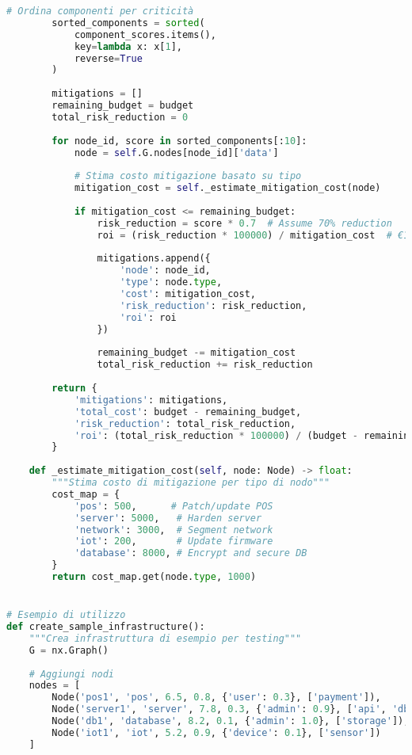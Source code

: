 \begin{lstlisting}[language=Python, caption=Implementazione dell'algoritmo ASSA-GDO]
        # Ordina componenti per criticità
        sorted_components = sorted(
            component_scores.items(), 
            key=lambda x: x[1], 
            reverse=True
        )
        
        mitigations = []
        remaining_budget = budget
        total_risk_reduction = 0
        
        for node_id, score in sorted_components[:10]:
            node = self.G.nodes[node_id]['data']
            
            # Stima costo mitigazione basato su tipo
            mitigation_cost = self._estimate_mitigation_cost(node)
            
            if mitigation_cost <= remaining_budget:
                risk_reduction = score * 0.7  # Assume 70% reduction
                roi = (risk_reduction * 100000) / mitigation_cost  # €100k per point
                
                mitigations.append({
                    'node': node_id,
                    'type': node.type,
                    'cost': mitigation_cost,
                    'risk_reduction': risk_reduction,
                    'roi': roi
                })
                
                remaining_budget -= mitigation_cost
                total_risk_reduction += risk_reduction
                
        return {
            'mitigations': mitigations,
            'total_cost': budget - remaining_budget,
            'risk_reduction': total_risk_reduction,
            'roi': (total_risk_reduction * 100000) / (budget - remaining_budget)
        }
    
    def _estimate_mitigation_cost(self, node: Node) -> float:
        """Stima costo di mitigazione per tipo di nodo"""
        cost_map = {
            'pos': 500,      # Patch/update POS
            'server': 5000,   # Harden server
            'network': 3000,  # Segment network
            'iot': 200,       # Update firmware
            'database': 8000, # Encrypt and secure DB
        }
        return cost_map.get(node.type, 1000)


# Esempio di utilizzo
def create_sample_infrastructure():
    """Crea infrastruttura di esempio per testing"""
    G = nx.Graph()
    
    # Aggiungi nodi
    nodes = [
        Node('pos1', 'pos', 6.5, 0.8, {'user': 0.3}, ['payment']),
        Node('server1', 'server', 7.8, 0.3, {'admin': 0.9}, ['api', 'db']),
        Node('db1', 'database', 8.2, 0.1, {'admin': 1.0}, ['storage']),
        Node('iot1', 'iot', 5.2, 0.9, {'device': 0.1}, ['sensor'])
    ]
    

\end{lstlisting}
